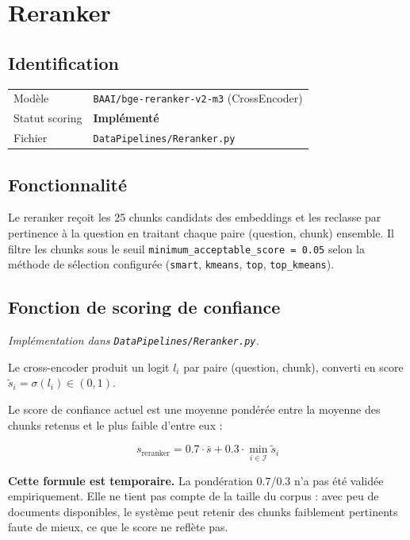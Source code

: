 \chapter{Reranker}

\section{Identification}

\begin{center}
\begin{tabular}{ll}
\toprule
Modèle         & \texttt{BAAI/bge-reranker-v2-m3} (CrossEncoder) \\
Statut scoring & \textbf{Implémenté} \\
Fichier        & \texttt{DataPipelines/Reranker.py} \\
\bottomrule
\end{tabular}
\end{center}

\section{Fonctionnalité}

Le reranker reçoit les 25 chunks candidats des embeddings et les reclasse par
pertinence à la question en traitant chaque paire (question, chunk) ensemble.
Il filtre les chunks sous le seuil \texttt{minimum\_acceptable\_score = 0.05}
selon la méthode de sélection configurée (\texttt{smart}, \texttt{kmeans},
\texttt{top}, \texttt{top\_kmeans}).

\section{Fonction de scoring de confiance}

\noindent\textit{Implémentation dans \texttt{DataPipelines/Reranker.py}.}

\medskip
Le cross-encoder produit un logit $l_i$ par paire (question, chunk), converti
en score $\tilde{s}_i = \sigma(l_i) \in (0,1)$.

Le score de confiance actuel est une moyenne pondérée entre la moyenne des
chunks retenus et le plus faible d'entre eux :

\begin{equation}
  s_{\text{reranker}}
  = 0.7 \cdot \bar{s} + 0.3 \cdot \min_{i \in \mathcal{I}} \tilde{s}_i
  \label{eq:reranker}
\end{equation}

\noindent\textbf{Cette formule est temporaire.} La pondération 0.7/0.3 n'a
pas été validée empiriquement. Elle ne tient pas compte de la taille du corpus :
avec peu de documents disponibles, le système peut retenir des chunks
faiblement pertinents faute de mieux, ce que le score ne reflète pas.

